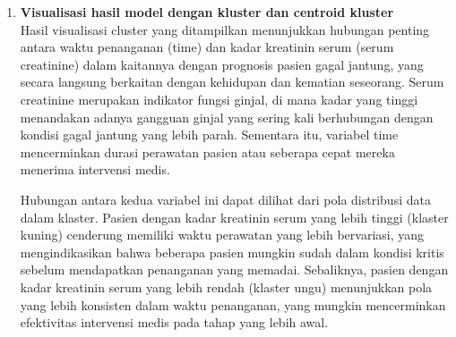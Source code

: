 \documentclass[english,12pt,a4paper,openany]{book}
\begin{document}
\begin{enumerate}
		
		\item\textbf{Visualisasi hasil model dengan kluster dan centroid kluster}\\
		
		
		
		Hasil visualisasi cluster yang ditampilkan menunjukkan hubungan penting antara waktu penanganan (time) dan kadar kreatinin serum (serum creatinine) dalam kaitannya dengan prognosis pasien gagal jantung, yang secara langsung berkaitan dengan kehidupan dan kematian seseorang. Serum creatinine merupakan indikator fungsi ginjal, di mana kadar yang tinggi menandakan adanya gangguan ginjal yang sering kali berhubungan dengan kondisi gagal jantung yang lebih parah. Sementara itu, variabel time mencerminkan durasi perawatan pasien atau seberapa cepat mereka menerima intervensi medis.
		
		Hubungan antara kedua variabel ini dapat dilihat dari pola distribusi data dalam klaster. Pasien dengan kadar kreatinin serum yang lebih tinggi (klaster kuning) cenderung memiliki waktu perawatan yang lebih bervariasi, yang mengindikasikan bahwa beberapa pasien mungkin sudah dalam kondisi kritis sebelum mendapatkan penanganan yang memadai. Sebaliknya, pasien dengan kadar kreatinin serum yang lebih rendah (klaster ungu) menunjukkan pola yang lebih konsisten dalam waktu penanganan, yang mungkin mencerminkan efektivitas intervensi medis pada tahap yang lebih awal.
		

\end{enumerate}
\end{document}
